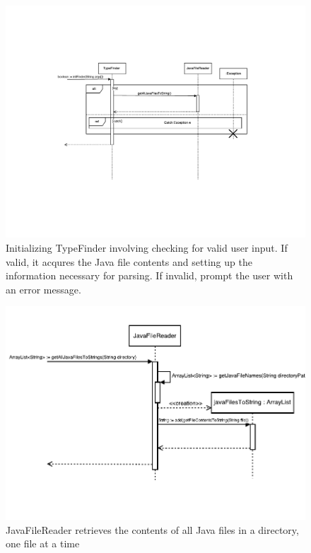 \documentclass[12p]{article}
\begin{document}
\begin{figure}
  \includegraphics[width=1.0\textwidth]{initFinder.pdf}
  \caption{Initializing TypeFinder involving checking for valid user input. If valid, it acqures the Java file contents and setting up the information necessary for parsing. If invalid, prompt the user with an error message.} %
  \label{fig:sequence2}
\end{figure}

\begin{figure}
  \includegraphics[width=1.0\textwidth]{getAllJavaFilesToString.pdf}
  \caption{JavaFileReader retrieves the contents of all Java files in a directory, one file at a time} %
  \label{fig:sequence2}
\end{figure}
\end{document}
